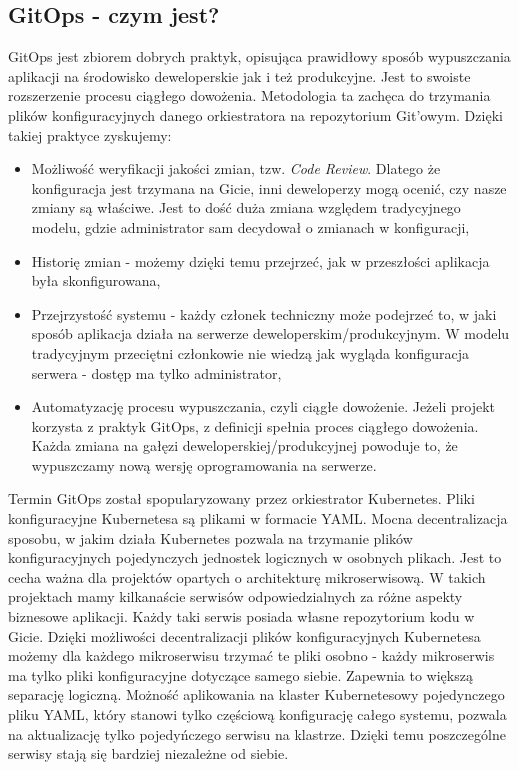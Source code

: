 \subsection{GitOps - czym jest?}
GitOps jest zbiorem dobrych praktyk, opisująca prawidłowy sposób wypuszczania aplikacji na środowisko deweloperskie jak i też produkcyjne. Jest to swoiste rozszerzenie procesu ciągłego dowożenia. Metodologia ta zachęca do trzymania plików konfiguracyjnych danego orkiestratora na repozytorium Git'owym. Dzięki takiej praktyce zyskujemy:
\begin{itemize}
    \item Możliwość weryfikacji jakości zmian, tzw. \textit{Code Review}. Dlatego że konfiguracja jest trzymana na Gicie, inni deweloperzy mogą ocenić, czy nasze zmiany są właściwe. Jest to dość duża zmiana względem tradycyjnego modelu, gdzie administrator sam decydował o zmianach w konfiguracji,
    \item Historię zmian - możemy dzięki temu przejrzeć, jak w przeszłości aplikacja była skonfigurowana,
    \item Przejrzystość systemu - każdy członek techniczny może podejrzeć to, w jaki sposób aplikacja działa na serwerze deweloperskim/produkcyjnym. W modelu tradycyjnym przeciętni członkowie nie wiedzą jak wygląda konfiguracja serwera - dostęp ma tylko administrator,
    \item Automatyzację procesu wypuszczania, czyli ciągłe dowożenie. Jeżeli projekt korzysta z praktyk GitOps, z definicji spełnia proces ciągłego dowożenia. Każda zmiana na gałęzi deweloperskiej/produkcyjnej powoduje to, że wypuszczamy nową wersję oprogramowania na serwerze.
\end{itemize}
\par
Termin GitOps został spopularyzowany przez orkiestrator Kubernetes. Pliki konfiguracyjne Kubernetesa są plikami w formacie YAML. Mocna decentralizacja sposobu, w jakim działa Kubernetes pozwala na trzymanie plików konfiguracyjnych pojedynczych jednostek logicznych w osobnych plikach. Jest to cecha ważna dla projektów opartych o architekturę mikroserwisową. W takich projektach mamy kilkanaście serwisów odpowiedzialnych za różne aspekty biznesowe aplikacji. Każdy taki serwis posiada własne repozytorium kodu w Gicie. Dzięki możliwości decentralizacji plików konfiguracyjnych Kubernetesa możemy dla każdego mikroserwisu trzymać te pliki osobno - każdy mikroserwis ma tylko pliki konfiguracyjne dotyczące samego siebie. Zapewnia to większą separację logiczną. Możność aplikowania na klaster Kubernetesowy pojedynczego pliku YAML, który stanowi tylko częściową konfigurację całego systemu, pozwala na aktualizację tylko pojedyńczego serwisu na klastrze. Dzięki temu poszczególne serwisy stają się bardziej niezależne od siebie.
